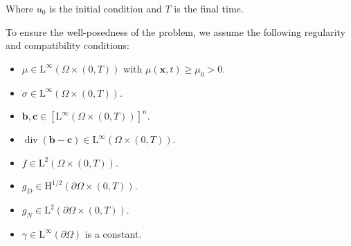 \documentclass[11pt]{book}
\begin{document}
Where \( u_0 \) is the initial condition and \( T \) is the final time.

To ensure the well-posedness of the problem, we assume the following regularity and compatibility conditions:
\begin{itemize}
    \item \( \mu \in \mathrm{L}^{\infty}(\Omega \times (0, T)) \) with \( \mu(\mathbf{x}, t) \geq \mu_0 > 0 \).
    \item \( \sigma \in \mathrm{L}^{\infty}(\Omega \times (0, T)) \).
    \item \( \mathbf{b}, \mathbf{c} \in [\mathrm{L}^{\infty}(\Omega \times (0, T))]^n \).
    \item \( \operatorname{div}(\mathbf{b} - \mathbf{c}) \in \mathrm{L}^{\infty}(\Omega \times (0, T)) \).
    \item \( f \in \mathrm{L}^2(\Omega \times (0, T)) \).
    \item \( g_D \in \mathrm{H}^{1/2}(\partial \Omega \times (0, T)) \).
    \item \( g_N \in \mathrm{L}^2(\partial \Omega \times (0, T)) \).
    \item \( \gamma \in \mathrm{L}^{\infty}(\partial \Omega) \) is a constant.
\end{itemize}
\end{document}
